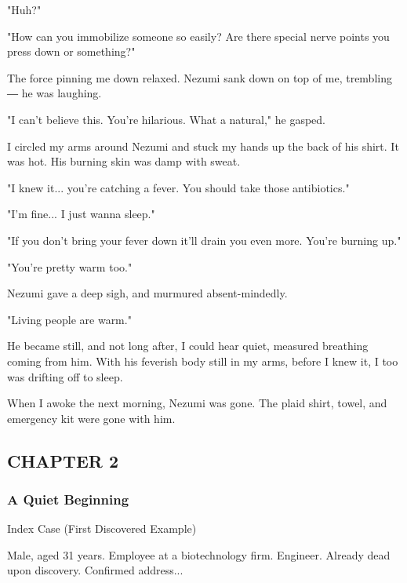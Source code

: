 "Huh?"

"How can you immobilize someone so easily? Are there special nerve
points you press down or something?"

The force pinning me down relaxed. Nezumi sank down on top of me,
trembling ― he was laughing.

"I can't believe this. You're hilarious. What a natural," he gasped.

I circled my arms around Nezumi and stuck my hands up the back of his
shirt. It was hot. His burning skin was damp with sweat.

"I knew it... you're catching a fever. You should take those
antibiotics."

"I'm fine... I just wanna sleep."

"If you don't bring your fever down it'll drain you even more. You're
burning up."

"You're pretty warm too."

Nezumi gave a deep sigh, and murmured absent-mindedly.

"Living people are warm."

He became still, and not long after, I could hear quiet, measured
breathing coming from him. With his feverish body still in my arms,
before I knew it, I too was drifting off to sleep.

When I awoke the next morning, Nezumi was gone. The plaid shirt, towel,
and emergency kit were gone with him.

\hypertarget{index_split_001.htmlux5cux23calibre_pb_24}{}

\protect\hypertarget{index_split_024.html}{}{}

\hypertarget{index_split_024.htmlux5cux23calibre_pb_0}{}

\hypertarget{index_split_024.htmlux5cux23calibre_toc_3}{%
\subsection{CHAPTER
2~}\label{index_split_024.htmlux5cux23calibre_toc_3}}

\subsubsection{A Quiet Beginning}

Index Case (First Discovered Example)

Male, aged 31 years. Employee at a biotechnology firm. Engineer. Already
dead upon discovery. Confirmed address...

